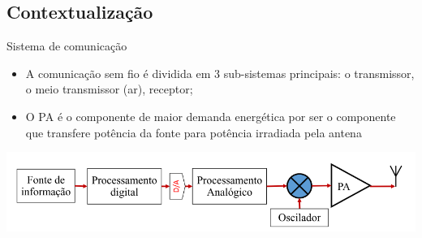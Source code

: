 \documentclass{if-beamer}
\begin{document}

\subsection{Contextualização}
\begin{frame}{Sistema de comunicação}
	\begin{itemize}
		\item A comunicação sem fio é dividida em 3 sub-sistemas principais:	o transmissor, o meio transmissor (ar), receptor;
		\item O PA é o componente de maior demanda energética por ser o componente que transfere potência da fonte para potência irradiada pela antena
	\end{itemize}
	\includegraphics[scale=0.5]{sistematrasmissorpng.png}
\end{frame}

\end{document}
